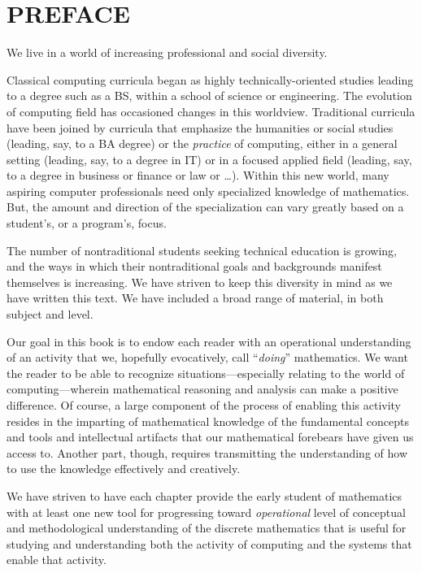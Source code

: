 
\chapter*{PREFACE}

We live in a world of increasing professional and social diversity.

\medskip

Classical computing curricula began as highly technically-oriented
studies leading to a degree such as a BS, within a school of science
or engineering.  The evolution of computing field has occasioned
changes in this worldview.  Traditional curricula have been joined by
curricula that emphasize the humanities or social studies (leading,
say, to a BA degree) or the {\em practice} of computing, either in a
general setting (leading, say, to a degree in IT) or in a focused
applied field (leading, say, to a degree in business or finance or law
or \ldots).  Within this new world, many aspiring computer
professionals need only specialized knowledge of mathematics.  But,
the amount and direction of the specialization can vary greatly based
on a student's, or a program's, focus.

\medskip

The number of nontraditional students seeking technical education is
growing, and the ways in which their nontraditional goals and
backgrounds manifest themselves is increasing.  We have striven to
keep this diversity in mind as we have written this text.  We have
included a broad range of material, in both subject and level.

\bigskip

Our goal in this book is to endow each reader with an operational
understanding of an activity that we, hopefully evocatively, call
``{\em doing}'' mathematics.  We want the reader to be able to
recognize situations---especially relating to the world of
computing---wherein mathematical reasoning and analysis can make a
positive difference.  Of course, a large component of the process of
enabling this activity resides in the imparting of mathematical
knowledge of the fundamental concepts and tools and intellectual
artifacts that our mathematical forebears have given us access to.
Another part, though, requires transmitting the understanding of how
to use the knowledge effectively and creatively.

We have striven to have each chapter provide the early student of
mathematics with at least one new tool for progressing toward {\em
  operational} level of conceptual and methodological understanding of
the discrete mathematics that is useful for studying and understanding
both the activity of computing and the systems that enable that
activity.

